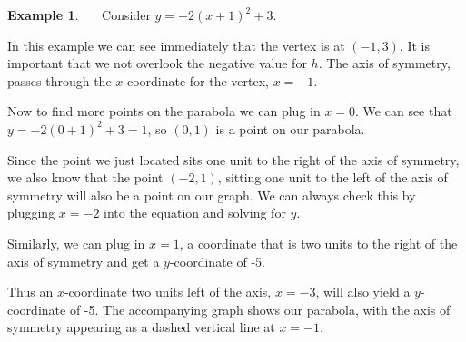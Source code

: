 \documentclass[12pt]{book}
\theoremstyle{definition}
\newtheorem{example}{Example}
\begin{document}
\begin{example}~~~Consider $y=-2(x+1)^2+3$.\par
{}\label{trans1}
In this example we can see immediately that the vertex is at $(-1,3)$. It is important that we not overlook the negative value for $h$.  The axis of symmetry, passes through the $x$-coordinate for the vertex, $x=-1$.\par
Now to find more points on the parabola we can plug in $x=0$. We can see that $y = -2(0+1)^2+3=1$, so $(0,1)$ is a point on our parabola.\par
\newpage
\begin{multicols}{2}
Since the point we just located sits one unit to the right of the axis of symmetry, we also know that the point $(-2,1)$, sitting one unit to the left of the axis of symmetry will also be a point on our graph.  We can always check this by plugging $x=-2$ into the equation and solving for $y$.\par
Similarly, we can plug in $x=1$, a coordinate that is two units to the right of the axis of symmetry and get a $y$-coordinate of -5.\par
Thus an $x$-coordinate two units left of the axis, $x=-3$, will also yield a $y$-coordinate of -5.  The accompanying graph shows our parabola, with the axis of symmetry appearing as a dashed vertical line at $x=-1$.  

\columnbreak

\begin{center}
\end{center}
\end{multicols}
\end{example}
\end{document}
